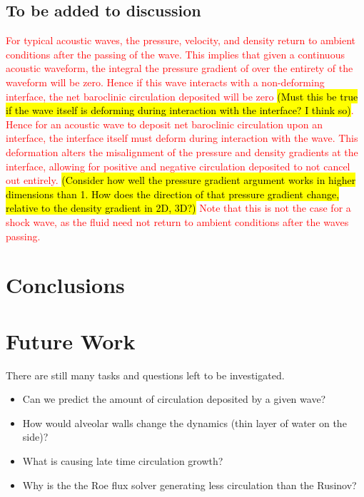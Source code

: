 \subsection{To be added to discussion}
\textcolor{red}{ For typical acoustic waves, the pressure, velocity, and
  density return to ambient conditions after the passing of the
  wave. This implies that given a continuous acoustic waveform, the
  integral the pressure gradient of over the entirety of the waveform
  will be zero.  Hence if this wave interacts with a non-deforming
  interface, the net baroclinic circulation deposited will be zero
  \hl{(Must this be true if the wave itself is deforming during
    interaction with the interface? I think so)}. Hence for an acoustic
  wave to deposit net baroclinic circulation upon an interface, the
  interface itself must deform during interaction with the wave. This
  deformation alters the misalignment of the pressure and density
  gradients at the interface, allowing for positive and negative
  circulation deposited to not cancel out entirely. \hl{(Consider how
    well the pressure gradient argument works in higher dimensions than
    1. How does the direction of that pressure gradient change, relative
    to the density gradient in 2D, 3D?)}  Note that this is not the case
  for a shock wave, as the fluid need not return to ambient conditions
  after the waves passing.}


\section{Conclusions} \label{sec:usbe_lung_conclusions}

\section{Future Work} \label{sec:usbe_lung_future}
There are still many tasks and questions left to be investigated.

\begin{itemize}
\item Can we predict the amount of circulation deposited by a given wave?
\item How would alveolar walls change the dynamics (thin layer of water on the side)?
\item What is causing late time circulation growth?
\item Why is the the Roe flux solver generating less circulation than the Rusinov?
\end{itemize}

